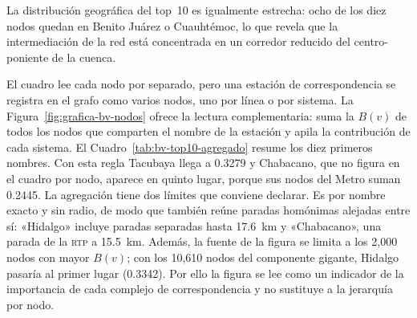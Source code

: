 La distribución geográfica del top~10 es igualmente estrecha: ocho de los diez
nodos quedan en Benito Juárez o Cuauhtémoc, lo que revela que la intermediación
de la red está concentrada en un corredor reducido del centro-poniente de la
cuenca.

El cuadro lee cada nodo por separado, pero una estación de correspondencia se
registra en el grafo como varios nodos, uno por línea o por sistema. La
Figura~\ref{fig:grafica-bv-nodos} ofrece la lectura complementaria: suma la $B(v)$ de
todos los nodos que comparten el nombre de la estación y apila la contribución
de cada sistema. El Cuadro~\ref{tab:bv-top10-agregado} resume los diez primeros
nombres. Con esta regla Tacubaya llega a 0.3279 y Chabacano, que no figura en el
cuadro por nodo, aparece en quinto lugar, porque sus nodos del Metro suman
0.2445. La agregación tiene dos límites que conviene declarar. Es por nombre
exacto y sin radio, de modo que también reúne paradas homónimas alejadas entre
sí: «Hidalgo» incluye paradas separadas hasta 17.6~km y «Chabacano», una parada
de la \textsc{rtp} a 15.5~km. Además, la fuente de la figura se limita a los
2{,}000 nodos con mayor $B(v)$; con los 10{,}610 nodos del componente gigante,
Hidalgo pasaría al primer lugar (0.3342). Por ello la figura se lee como un
indicador de la importancia de cada complejo de correspondencia y no sustituye
a la jerarquía por nodo.

